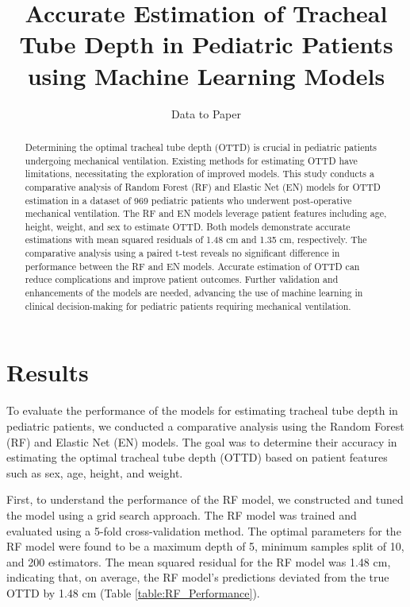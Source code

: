 \documentclass[11pt]{article}
\title{Accurate Estimation of Tracheal Tube Depth in Pediatric Patients using Machine Learning Models}
\author{Data to Paper}
\begin{document}
\maketitle
\begin{abstract}
Determining the optimal tracheal tube depth (OTTD) is crucial in pediatric patients undergoing mechanical ventilation. Existing methods for estimating OTTD have limitations, necessitating the exploration of improved models. This study conducts a comparative analysis of Random Forest (RF) and Elastic Net (EN) models for OTTD estimation in a dataset of 969 pediatric patients who underwent post-operative mechanical ventilation. The RF and EN models leverage patient features including age, height, weight, and sex to estimate OTTD. Both models demonstrate accurate estimations with mean squared residuals of 1.48 cm and 1.35 cm, respectively. The comparative analysis using a paired t-test reveals no significant difference in performance between the RF and EN models. Accurate estimation of OTTD can reduce complications and improve patient outcomes. Further validation and enhancements of the models are needed, advancing the use of machine learning in clinical decision-making for pediatric patients requiring mechanical ventilation.
\end{abstract}
\section*{Results}

To evaluate the performance of the models for estimating tracheal tube depth in pediatric patients, we conducted a comparative analysis using the Random Forest (RF) and Elastic Net (EN) models. The goal was to determine their accuracy in estimating the optimal tracheal tube depth (OTTD) based on patient features such as sex, age, height, and weight.

First, to understand the performance of the RF model, we constructed and tuned the model using a grid search approach. The RF model was trained and evaluated using a 5-fold cross-validation method. The optimal parameters for the RF model were found to be a maximum depth of 5, minimum samples split of 10, and 200 estimators. The mean squared residual for the RF model was 1.48 cm, indicating that, on average, the RF model's predictions deviated from the true OTTD by 1.48 cm (Table \ref{table:RF_Performance}).
\end{document}
